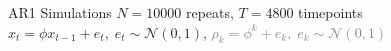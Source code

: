 \documentclass[8pt,aspectratio=169]{beamer}
\begin{document}
\begin{frame}{AR1 Simulations}
$N=10000$ repeats, $T = 4800$ timepoints \hfill $x_t = \phi x_{t-1} + e_t, \; e_t \sim \mathcal{N}(0, 1)$, \;\textcolor{gray}{$\rho_k = \phi^k + e_k,\; e_k \sim \mathcal{N}(0, 1)$}
\vfill
\centering
{}
\end{frame}
\end{document}
